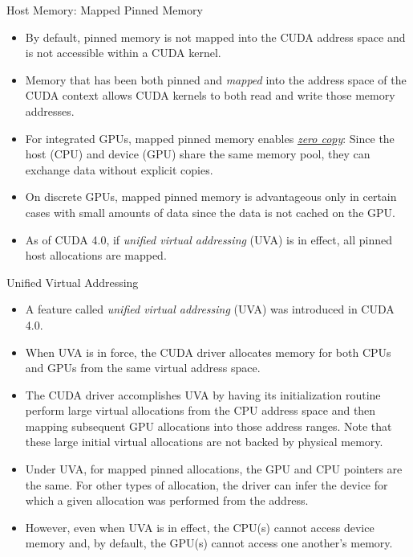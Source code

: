 \documentclass{beamer}
\begin{document}
\begin{frame}{Host Memory: Mapped Pinned Memory}
\begin{itemize}
    \item<1->By default, pinned memory is not mapped into the CUDA address space and is not accessible within a CUDA kernel.
    \item<1->Memory that has been both pinned and \emph{mapped} into the address space of the CUDA context allows CUDA kernels to both read and write those memory addresses.
    \item<1->For integrated GPUs, mapped pinned memory enables \href{http://docs.nvidia.com/cuda/cuda-c-best-practices-guide/\#zero-copy}{\color{blue}\emph{zero copy}}: Since the host (CPU) and device (GPU) share the same memory pool, they can exchange data without explicit copies.
    \item<1->On discrete GPUs, mapped pinned memory is advantageous only in certain cases with small amounts of data since the data is not cached on the GPU.
    \item<1->As of CUDA 4.0, if \emph{unified virtual addressing} (UVA) is in effect, all pinned host allocations are mapped.
\end{itemize}
\end{frame}

\begin{frame}{Unified Virtual Addressing}
\begin{itemize}
    \item<1->A feature called \emph{unified virtual addressing} (UVA) was introduced in CUDA 4.0.
    \item<1->When UVA is in force, the CUDA driver allocates memory for both CPUs and GPUs from the same virtual address space.
    \item<1->The CUDA driver accomplishes UVA by having its initialization routine perform large virtual allocations from the CPU address space and then mapping subsequent GPU allocations into those address ranges.  Note that these large initial virtual allocations are not backed by physical memory.
    \item<1->Under UVA, for mapped pinned allocations, the GPU and CPU pointers are the same.  For other types of allocation, the driver can infer the device for which a given allocation was performed from the address.
    \item<1->However, even when UVA is in effect, the CPU(s) cannot access device memory and, by default, the GPU(s) cannot access one another's memory.
\end{itemize}
\end{frame}
\end{document}
